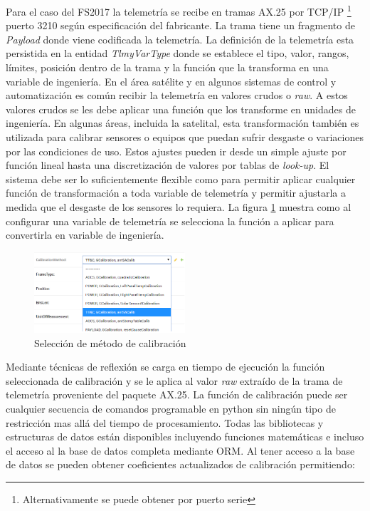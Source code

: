 \documentclass[twoside,twocolumn]{article}
\begin{document}
Para el caso del FS2017 la telemetría se recibe en tramas AX.25 por TCP/IP \footnote{Alternativamente se puede obtener por puerto serie} puerto 3210 según especificación del fabricante. La trama tiene un fragmento de \textit{Payload} donde viene codificada la telemetría. La definición de la telemetría esta persistida en la entidad \textit{TlmyVarType} donde se establece el tipo, valor, rangos, límites, posición dentro de la trama y la función que la transforma en una variable de ingeniería. En el área satélite y en algunos sistemas de control y automatización es común recibir la telemetría en valores crudos o \textit{raw}. A estos valores crudos se les debe aplicar una función que los transforme en unidades de ingeniería. En algunas áreas, incluida la satelital,  esta transformación también es utilizada para calibrar sensores o equipos que puedan sufrir desgaste o variaciones por las condiciones de uso. Estos ajustes pueden ir desde un simple ajuste por función lineal hasta una discretización de valores por tablas de \textit{look-up}. El sistema debe ser lo suficientemente flexible como para permitir aplicar cualquier función de transformación a toda variable de telemetría y permitir ajustarla a medida que el desgaste de los sensores lo requiera.
La figura \ref{fig:MetodoCalibracion} muestra como al configurar una variable de telemetría se selecciona la función a aplicar para convertirla en variable de ingeniería.

\begin{figure}[]
  \caption{Selección de método de calibración}
  \label{fig:MetodoCalibracion}
  \centering
  \includegraphics[width=0.5\textwidth]{Imagenes/TTCCalibracionDiscreta.png}
\end{figure}

Mediante técnicas de reflexión se carga en tiempo de ejecución la función seleccionada de calibración y se le aplica al valor \textit{raw} extraído de la trama de telemetría proveniente del paquete AX.25. La función de calibración puede ser cualquier secuencia de comandos programable en python sin ningún tipo de restricción mas allá del tiempo de procesamiento. Todas las bibliotecas y estructuras de datos están disponibles incluyendo funciones matemáticas e incluso el acceso al la base de datos completa mediante ORM.
Al tener acceso a la base de datos se pueden obtener coeficientes actualizados de calibración permitiendo: 
\end{document}
